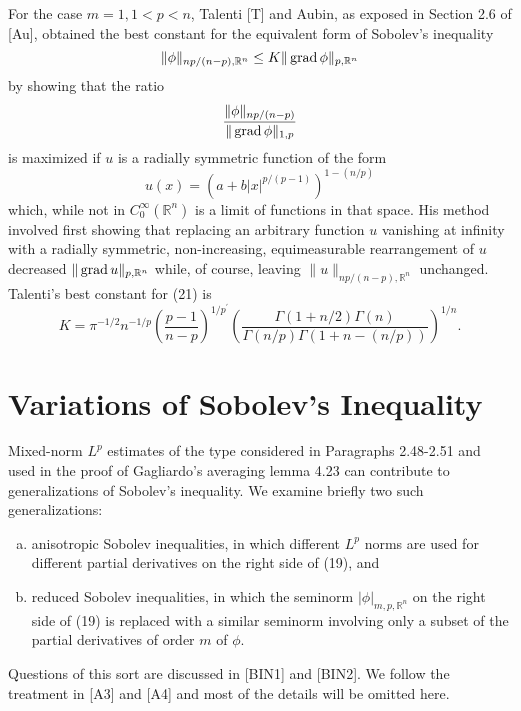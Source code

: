\begin{remark}
  For the case $m=1,1<p<n$, Talenti [T] and Aubin, as exposed in Section 2.6 of [Au],
  obtained the best constant for the equivalent form of Sobolev's inequality
  \[
  \|\phi\|_{n p /(n-p), \mathbb{R}^n} \leq K\|\operatorname{grad} \phi\|_{p, \mathbb{R}^n}
  \]
  by showing that the ratio
  \[
  \frac{\|\phi\|_{n p /(n-p)}}{\|\operatorname{grad} \phi\|_{1, p}}
  \]
  is maximized if $u$ is a radially symmetric function of the form
  \[
  u(x)=\left(a+b|x|^{p /(p-1)}\right)^{1-(n / p)}
  \]
  which, while not in $C_0^{\infty}\left(\mathbb{R}^n\right)$ is a limit of functions in that space.
  His method involved first showing that replacing an arbitrary function $u$ vanishing at infinity
  with a radially symmetric, non-increasing, equimeasurable rearrangement of $u$ decreased $\|\operatorname{grad} u\|_{p, \mathbb{R}^n}$ while, of course, leaving $\|u\|_{n p /(n-p), \mathbb{R}^n}$ unchanged.
  Talenti's best constant for (21) is
  \[
  K=\pi^{-1 / 2} n^{-1 / p}\left(\frac{p-1}{n-p}\right)^{1 / p^{\prime}}\left(\frac{\Gamma(1+n / 2) \Gamma(n)}{\Gamma(n / p) \Gamma(1+n-(n / p))}\right)^{1 / n}.
  \]
\end{remark}


\section{Variations of Sobolev's Inequality}


\begin{para}
  Mixed-norm $L^p$ estimates of the type considered in Paragraphs 2.48-2.51 and used in the proof of
  Gagliardo's averaging lemma 4.23 can contribute to generalizations of Sobolev's inequality.
  We examine briefly two such generalizations:
  
  \begin{enumerate}[(a)]
    \item anisotropic Sobolev inequalities, in which different $L^p$ norms are used for different 
      partial derivatives on the right side of (19), and
    \item reduced Sobolev inequalities, in which the seminorm $|\phi|_{m, p, \mathbb{R}^n}$ on the 
      right side of (19) is replaced with a similar seminorm involving only a subset of the partial 
      derivatives of order $m$ of $\phi$.
  \end{enumerate}
  
  Questions of this sort are discussed in [BIN1] and [BIN2]. We follow the treatment in [A3] and [A4]
  and most of the details will be omitted here.
\end{para}


